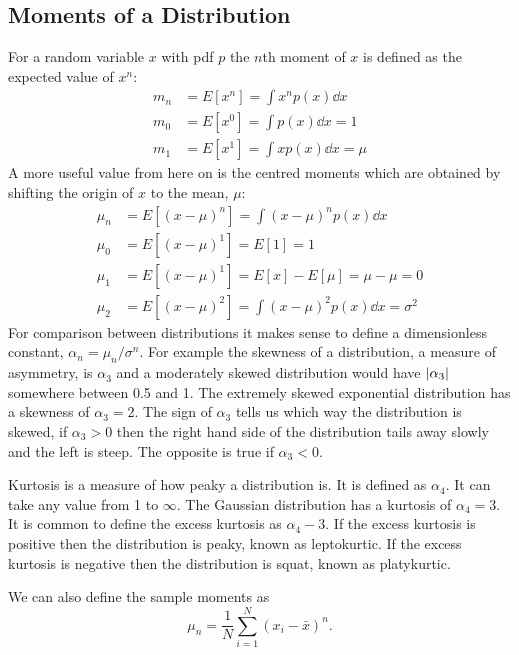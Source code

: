     \subsection{Moments of a Distribution}
    For a random variable \(x\) with \acrshort{pdf} \(p\) the \(n\)th moment of \(x\) is defined as the expected value of \(x^n\):
    \begin{align*}
        m_n &= E[x^n] = \int x^n p(x)\dd{x}\\
        m_0 &= E[x^0] = \int p(x)\dd{x} = 1\\
        m_1 &= E[x^1] = \int xp(x)\dd{x} = \mu
    \end{align*}
    A more useful value from here on is the centred moments which are obtained by shifting the origin of \(x\) to the mean, \(\mu\):
    \begin{align*}
        \mu_n &= E[(x - \mu)^n] = \int(x - \mu)^np(x)\dd{x}\\
        \mu_0 &= E[(x - \mu)^1] = E[1] = 1\\
        \mu_1 &= E[(x - \mu)^1] =  E[x] - E[\mu] = \mu - \mu = 0\\
        \mu_2 &= E[(x - \mu)^2] = \int(x - \mu)^2p(x)\dd{x} = \sigma^2
    \end{align*}
    For comparison between distributions it makes sense to define a dimensionless constant, \(\alpha_n = \mu_n/\sigma^n\).
    For example the skewness of a distribution, a measure of asymmetry, is \(\alpha_3\) and a moderately skewed distribution would have \(\abs{\alpha_3}\) somewhere between 0.5 and 1.
    The extremely skewed exponential distribution has a skewness of \(\alpha_3 = 2\).
    The sign of \(\alpha_3\) tells us which way the distribution is skewed, if \(\alpha_3 > 0\) then the right hand side of the distribution tails away slowly and the left is steep.
    The opposite is true if \(\alpha_3 < 0\).
    
    Kurtosis is a measure of how peaky a distribution is.
    It is defined as \(\alpha_4\).
    It can take any value from 1 to \(\infty\).
    The Gaussian distribution has a kurtosis of \(\alpha_4 = 3\).
    It is common to define the excess kurtosis as \(\alpha_4 - 3\).
    If the excess kurtosis is positive then the distribution is peaky, known as leptokurtic.
    If the excess kurtosis is negative then the distribution is squat, known as platykurtic.
    
    We can also define the sample moments as
    \[\mu_n = \frac{1}{N}\sum_{i=1}^{N} (x_i - \bar{x})^n.\]
    
